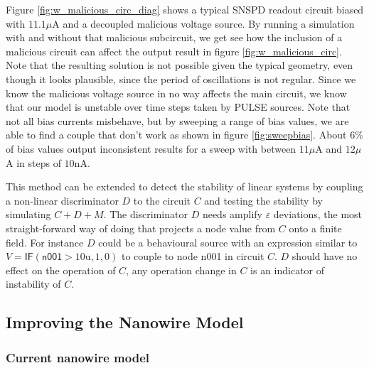 \documentclass[]{article}
\newcommand{\todoidea}[2][]{}
\newcommand{\todoexplain}[2][]{}
\newcommand{\todooptional}[2][]{}
\newcommand{\cf}[1]{\textsf{#1}}
\begin{document}
Figure \ref{fig:w_malicious_circ_diag} shows a typical SNSPD readout circuit biased with $11.1\mu$A
and a decoupled
malicious voltage source. By running a simulation with and without that malicious subcircuit,
we get see how the inclusion of a malicious circuit can affect the output result in figure
\ref{fig:w_malicious_circ}. Note that the resulting solution is not possible given the
typical geometry, even though it looks plausible, since the period of oscillations is not 
regular. Since we know the malicious voltage source in no way affects the main circuit,
we know that our model is unstable over time steps taken by PULSE sources. Note that
not all bias currents misbehave, but by sweeping a range of bias values, we are able to
find a couple that don't work as shown in figure \ref{fig:sweepbias}. About $6\%$ of
bias values output inconsistent results for a sweep with between $11\mu$A and $12\mu$A 
in steps of $10$nA.

This method can be extended to detect the stability of linear systems by coupling
a non-linear discriminator $D$ to the circuit $C$ and testing the stability by simulating
$C+D+M$. The discriminator $D$ needs amplify $\varepsilon$ deviations, the most straight-forward
way of doing that projects a node value from $C$ onto a finite field. For instance $D$ 
could be a behavioural source with an expression similar to $V=\cf{IF}(\cf{n001}>10\mathrm{u}, 1, 0)$ 
to couple to node \cf{n001} in circuit $C$. $D$ should have no effect on the operation of $C$,
any operation change in $C$ is an indicator of instability of $C$.

\todooptional[]{fig: extension to linear circuit stability??}

\todoexplain[]{what is counting to stability}

\todooptional[]{fig: malicious circuit examples}

\todoidea[]{extend to measuring stability of linear!}


\subsection{Improving the Nanowire Model}

\subsubsection{Current nanowire model}
\label{current_nw}
\end{document}
